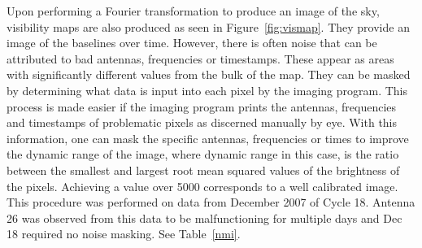 \documentclass[a4paper,12pt]{article}
\begin{document}
                                                                                                                                                                                                                                                                                                                                                                                                                                                                                                                                                                                                                                                                                                                                                                                                                                                                                                   Upon performing a Fourier transformation to produce an image of the sky, visibility maps are also produced as seen in Figure~\ref{fig:vismap}. They provide an image of the baselines over time. However, there is often noise that can be attributed to bad antennas, frequencies or timestamps. These appear as areas with significantly different values from the bulk of the map. They can be masked by determining what data is input into each pixel by the imaging program. This process is made easier if the imaging program prints the antennas, frequencies and timestamps of problematic pixels as discerned manually by eye. With this information, one can mask the specific antennas, frequencies or times to improve the dynamic range of the image, where dynamic range in this case, is the ratio between the smallest and largest root mean squared values of the brightness of the pixels. Achieving a value over 5000 corresponds to a well calibrated image. This procedure was performed on data from December 2007 of Cycle 18. Antenna 26 was observed from this data to be malfunctioning for multiple days and Dec 18 required no noise masking. See Table~\ref{nmi}.
\end{document}
